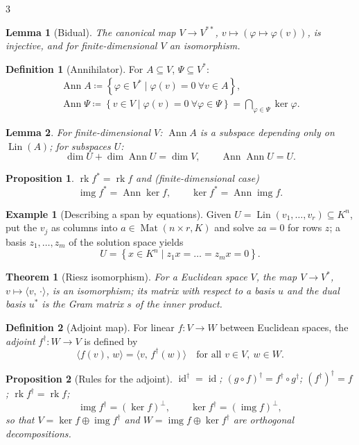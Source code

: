 \documentclass[10pt,a4paper,landscape]{article}
\theoremstyle{definition}
\newtheorem{defn}{Definition}[section]
\newtheorem{exm}{Example}[section]
\theoremstyle{plain}
\newtheorem{thm}{Theorem}[section]
\newtheorem{lem}{Lemma}[section]
\newtheorem{prop}{Proposition}[section]
\theoremstyle{remark}
\newcommand{\id}{\operatorname{id}}
\newcommand{\set}[1]{\left\{ #1 \right\}}
\newcommand{\deq}{\coloneqq}
\newcommand{\comp}{\circ}
\DeclareMathOperator{\Lin}{Lin}
\DeclareMathOperator{\Mat}{Mat}
\DeclareMathOperator{\rk}{rk}
\DeclareMathOperator{\img}{img}
\DeclareMathOperator{\Ann}{Ann}
\newcommand{\ip}[2]{\langle #1,\, #2 \rangle}
\newcommand{\dsum}{\oplus}
\begin{document}
\begin{multicols*}{3}
\begin{lem}[Bidual]
The canonical map $V \to V^{**}$, $v \mapsto (\varphi \mapsto \varphi(v))$, is injective, and for finite-dimensional $V$ an isomorphism.
\end{lem}

\begin{defn}[Annihilator]
For $A \subseteq V$, $\Psi \subseteq V^{*}$:
{\footnotesize\[
\begin{gathered}
\Ann A \deq \set{\varphi \in V^{*} \mid \varphi(v) = 0 \ \forall v \in A},\\
\Ann \Psi \deq \set{v \in V \mid \varphi(v) = 0 \ \forall \varphi \in \Psi} = \bigcap_{\varphi \in \Psi} \ker \varphi.
\end{gathered}
\]}
\end{defn}

\begin{lem}
For finite-dimensional $V$: $\Ann A$ is a subspace depending only on $\Lin(A)$; for subspaces $U$:
\[
\dim U + \dim \Ann U = \dim V, \qquad \Ann \Ann U = U .
\]
\end{lem}

\begin{prop}
$\rk f^{*} = \rk f$ and (finite-dimensional case)
\[
\img f^{*} = \Ann \ker f, \qquad \ker f^{*} = \Ann \img f .
\]
\end{prop}

\begin{exm}[Describing a span by equations]
Given $U = \Lin(v_1, \dots, v_r) \subseteq K^n$, put the $v_j$ as columns into $a \in \Mat(n \times r, K)$ and solve $z a = 0$ for rows $z$; a basis $z_1, \dots, z_m$ of the solution space yields
\[
U = \set{x \in K^n \mid z_1 x = \dots = z_m x = 0}.
\]
\end{exm}

\begin{thm}[Riesz isomorphism]
For a Euclidean space $V$, the map $V \to V^{*}$, $v \mapsto \ip{v}{\cdot}$, is an isomorphism; its matrix with respect to a basis $u$ and the dual basis $u^{*}$ is the Gram matrix $s$ of the inner product.
\end{thm}

\begin{defn}[Adjoint map]
For linear $f: V \to W$ between Euclidean spaces, the \emph{adjoint} $f^{\dagger}: W \to V$ is defined by
\[
\ip{f(v)}{w} = \ip{v}{f^{\dagger}(w)} \quad \text{for all } v \in V,\ w \in W .
\]
\end{defn}

\begin{prop}[Rules for the adjoint]
$\id^{\dagger} = \id$; $(g \comp f)^{\dagger} = f^{\dagger} \comp g^{\dagger}$; $(f^{\dagger})^{\dagger} = f$; $\rk f^{\dagger} = \rk f$;
\[
\img f^{\dagger} = (\ker f)^{\bot}, \qquad \ker f^{\dagger} = (\img f)^{\bot},
\]
so that $V = \ker f \dsum \img f^{\dagger}$ and $W = \img f \dsum \ker f^{\dagger}$ are orthogonal decompositions.
\end{prop}


\end{multicols*}
\end{document}
